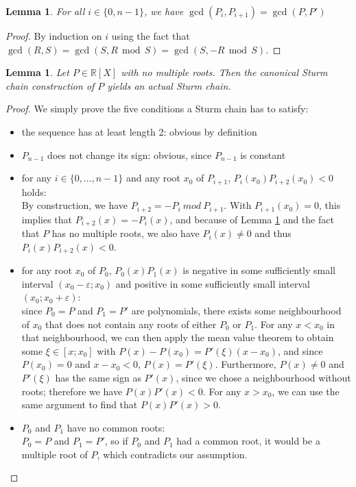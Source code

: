 \documentclass[11pt,a4paper,oneside]{article}
\newtheorem{lemma}[definition]{Lemma}
\newcommand{\RR}{\mathbb{R}}
\renewcommand{\epsilon}{\varepsilon}
\renewcommand{\mod}{\ \ \textrm{mod}\ \ }
\begin{document}
\begin{lemma}\label{thm:sturm_gcd}
For all $i\in\{0,n-1\}$, we have $\gcd(P_i, P_{i+1}) = \gcd(P,P')$\\
\end{lemma}
\begin{proof}
By induction on $i$ using the fact that $\gcd(R,S)=\gcd(S,R\mod S)=\gcd(S,-R\mod S)$.
\end{proof}

\begin{lemma}\label{thm:sturm_seq_canonical}
Let $P\in\RR[X]$ with no multiple roots. Then the canonical Sturm chain construction of $P$ yields an actual Sturm chain.
\end{lemma}
\begin{proof}
We simply prove the five conditions a Sturm chain has to satisfy:
\begin{itemize}
\item the sequence has at least length 2: obvious by definition
\item $P_{n-1}$ does not change its sign: obvious, since $P_{n-1}$ is constant
\item for any $i\in\{0,\ldots,n-1\}$ and any root $x_0$ of $P_{i+1}$, $P_{i}(x_0)P_{i+2}(x_0) < 0$ holds:\\
By construction, we have $P_{i+2} = -P_{i}\ \textit{mod}\ P_{i+1}$. With $P_{i+1}(x_0)=0$, this implies that $P_{i+2}(x) = -P_i(x)$, and because of Lemma \ref{thm:sturm_gcd} and the fact that $P$ has no multiple roots, we also have $P_i(x)\neq 0$ and thus $P_i(x)P_{i+2}(x)<0$.
\item for any root $x_0$ of $P_0$, $P_0(x)P_1(x)$ is negative in some sufficiently small interval $(x_0-\epsilon;x_0)$ and positive in some sufficiently small interval $(x_0;x_0+\epsilon)$:\\
since $P_0=P$ and $P_1=P'$ are polynomials, there exists some neighbourhood of $x_0$ that does not contain any roots of either $P_0$ or $P_1$. For any $x<x_0$ in that neighbourhood, we can then apply the mean value theorem to obtain some $\xi\in[x;x_0]$ with $P(x)-P(x_0) = P'(\xi)(x-x_0)$, and since $P(x_0)=0$ and $x-x_0<0$, $P(x)=P'(\xi)$. Furthermore, $P(x)\neq 0$ and $P'(\xi)$ has the same sign as $P'(x)$, since we chose a neighbourhood without roots; therefore we have $P(x)P'(x)<0$. For any $x>x_0$, we can use the same argument to find that $P(x)P'(x)>0$.
\item $P_0$ and $P_1$ have no common roots:\\
$P_0=P$ and $P_1=P'$, so if $P_0$ and $P_1$ had a common root, it would be a multiple root of $P$, which contradicts our assumption.
\end{itemize}
\end{proof}
\end{document}
